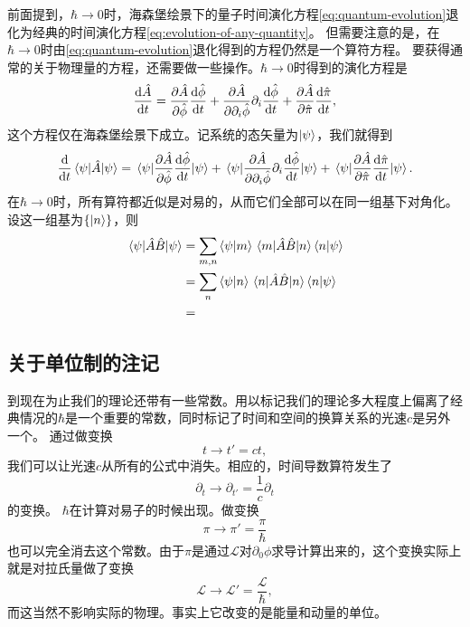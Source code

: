 \documentclass[hyperref, UTF8, a4paper]{ctexart}
\begin{document}
前面提到，$\hbar \to 0$时，海森堡绘景下的量子时间演化方程\eqref{eq:quantum-evolution}退化为经典的时间演化方程\eqref{eq:evolution-of-any-quantity}。
但需要注意的是，在$\hbar\to 0$时由\eqref{eq:quantum-evolution}退化得到的方程仍然是一个算符方程。
要获得通常的关于物理量的方程，还需要做一些操作。$\hbar\to 0$时得到的演化方程是
\[
    \dv{\hat{A}}{t} = \pdv{\hat{A}}{\hat{\phi}} \dv{\hat{\phi}}{t} + \pdv{\hat{A}}{\partial_i \hat{\phi}} \partial_i \dv{\hat{\phi}}{t} + \pdv{\hat{A}}{\hat{\pi}} \dv{\hat{\pi}}{t},
\]
这个方程仅在海森堡绘景下成立。记系统的态矢量为$\ket{\psi}$，我们就得到
\[
    \dv{t} \mel{\psi}{\hat{A}}{\psi} =  \mel{\psi}{\pdv{\hat{A}}{\hat{\phi}} \dv{\hat{\phi}}{t}}{\psi} + \mel{\psi}{\pdv{\hat{A}}{\partial_i \hat{\phi}} \partial_i \dv{\hat{\phi}}{t}}{\psi} + \mel{\psi}{\pdv{\hat{A}}{\hat{\pi}} \dv{\hat{\pi}}{t}}{\psi}.
\]
在$\hbar\to 0$时，所有算符都近似是对易的，从而它们全部可以在同一组基下对角化。设这一组基为$\{\ket{n}\}$，则
\[
    \begin{aligned}
        \mel{\psi}{\hat{A}\hat{B}}{\psi} &= \sum_{m,n} \braket{\psi}{m} \mel{m}{\hat{A}\hat{B}}{n} \braket{n}{\psi} \\
        &= \sum_{n} \braket{\psi}{n} \mel{n}{\hat{A}\hat{B}}{n} \braket{n}{\psi} \\
        &= 
    \end{aligned}
\]

\subsection{关于单位制的注记}

到现在为止我们的理论还带有一些常数。用以标记我们的理论多大程度上偏离了经典情况的$\hbar$是一个重要的常数，同时标记了时间和空间的换算关系的光速$c$是另外一个。
通过做变换
\[
    t \longrightarrow t' = ct,
\]
我们可以让光速$c$从所有的公式中消失。相应的，时间导数算符发生了
\[
    \partial_t \longrightarrow \partial_{t'} = \frac{1}{c} \partial_t
\]
的变换。
$\hbar$在计算对易子的时候出现。做变换
\[
    \pi \longrightarrow \pi' = \frac{\pi}{\hbar}
\]
也可以完全消去这个常数。由于$\pi$是通过$\mathcal{L}$对$\partial_0 \phi$求导计算出来的，这个变换实际上就是对拉氏量做了变换
\[
    \mathcal{L} \longrightarrow \mathcal{L}' = \frac{\mathcal{L}}{\hbar},
\]
而这当然不影响实际的物理。事实上它改变的是能量和动量的单位。
\end{document}
